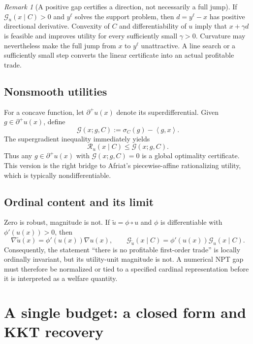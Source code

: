 \documentclass[11pt]{article}
\newcommand{\cG}{\mathcal{G}}
\newcommand{\cR}{\mathcal{R}}
\newcommand{\ip}[2]{\left\langle #1,#2\right\rangle}
\theoremstyle{definition}
\theoremstyle{remark}
\newtheorem{remark}[theorem]{Remark}
\begin{document}
\begin{remark}[A positive gap certifies a direction, not necessarily a full jump]
If $\cG_u(x\mid C)>0$ and $y^\ell$ solves the support problem, then
$d=y^\ell-x$ has positive directional derivative.  Convexity of $C$ and differentiability of
$u$ imply that $x+\gamma d$ is feasible and improves utility for every sufficiently small
$\gamma>0$.  Curvature may nevertheless make the full jump from $x$ to $y^\ell$ unattractive.
A line search or a sufficiently small step converts the linear certificate into an actual
profitable trade.
\end{remark}

\subsection{Nonsmooth utilities}

For a concave function, let $\partial^+u(x)$ denote its superdifferential.  Given
$g\in\partial^+u(x)$, define
\[
  \cG(x;g,C):=\sigma_C(g)-\ip{g}{x}.
\]
The supergradient inequality immediately yields
\begin{equation}
  \cR_u(x\mid C)\le\cG(x;g,C).
  \label{eq:supergradient-certificate}
\end{equation}
Thus any $g\in\partial^+u(x)$ with $\cG(x;g,C)=0$ is a global optimality certificate.
This version is the right bridge to Afriat's piecewise-affine rationalizing utility, which is
typically nondifferentiable.

\subsection{Ordinal content and its limit}

Zero is robust, magnitude is not.  If $\widetilde u=\phi\circ u$ and $\phi$ is differentiable
with $\phi'(u(x))>0$, then
\[
  \nabla\widetilde u(x)=\phi'(u(x))\nabla u(x),
  \qquad
  \cG_{\widetilde u}(x\mid C)=\phi'(u(x))\cG_u(x\mid C).
\]
Consequently, the statement ``there is no profitable first-order trade'' is locally ordinally
invariant, but its utility-unit magnitude is not.  A numerical NPT gap must therefore be normalized
or tied to a specified cardinal representation before it is interpreted as a welfare quantity.

\section{A single budget: a closed form and KKT recovery}
\end{document}
